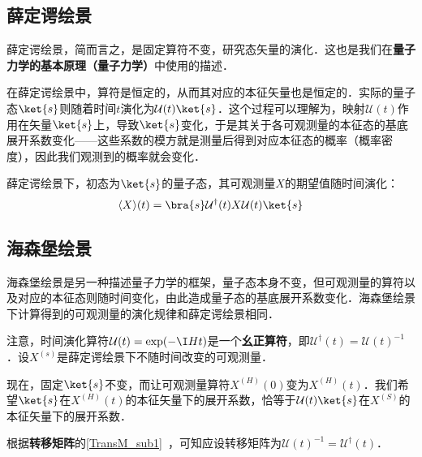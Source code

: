 
\subsection{薛定谔绘景}

薛定谔绘景，简而言之，是固定算符不变，研究态矢量的演化．这也是我们在\textbf{量子力学的基本原理（量子力学）}中使用的描述．

在薛定谔绘景中，算符是恒定的，从而其对应的本征矢量也是恒定的．实际的量子态$\ket{s}$则随着时间$t$演化为$\mathcal{U}(t)\ket{s}$．这个过程可以理解为，映射$\mathcal{U}(t)$作用在矢量$\ket{s}$上，导致$\ket{s}$变化，于是其关于各可观测量的本征态的基底展开系数变化——这些系数的模方就是测量后得到对应本征态的概率（概率密度），因此我们观测到的概率就会变化．

薛定谔绘景下，初态为$\ket{s}$的量子态，其可观测量$X$的期望值随时间演化：
\begin{equation}
\langle X \rangle(t) = \bra{s}\mathcal{U}^\dagger(t)X\mathcal{U}(t)\ket{s}
\end{equation}



\subsection{海森堡绘景}

海森堡绘景是另一种描述量子力学的框架，量子态本身不变，但可观测量的算符以及对应的本征态则随时间变化，由此造成量子态的基底展开系数变化．海森堡绘景下计算得到的可观测量的演化规律和薛定谔绘景相同．

注意，时间演化算符$\mathcal{U}(t)=\exp(-\I Ht)$是一个\textbf{幺正算符}，即$\mathcal{U}^\dagger(t)=\mathcal{U}(t)^{-1}$．设$X^{(s)}$是薛定谔绘景下不随时间改变的可观测量．

现在，固定$\ket{s}$不变，而让可观测量算符$X^{(H)}(0)$变为$X^{(H)}(t)$．我们希望$\ket{s}$在$X^{(H)}(t)$的本征矢量下的展开系数，恰等于$\mathcal{U}(t)\ket{s}$在$X^{(S)}$的本征矢量下的展开系数．

根据\textbf{转移矩阵}的\autoref{TransM_sub1}~，可知应设转移矩阵为$\mathcal{U}(t)^{-1}=\mathcal{U}^\dagger(t)$．


















